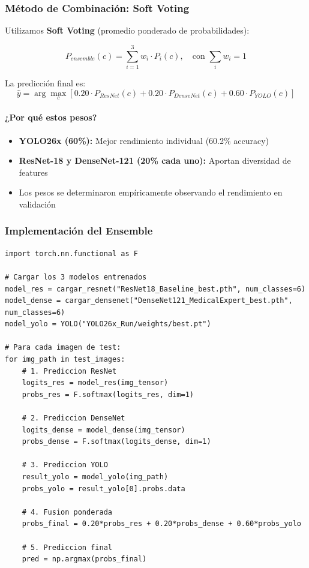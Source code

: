 \documentclass[12pt,a4paper]{article}
\begin{document}
\subsubsection{Método de Combinación: Soft Voting}

Utilizamos \textbf{Soft Voting} (promedio ponderado de probabilidades):

\begin{equation}
P_{ensemble}(c) = \sum_{i=1}^{3} w_i \cdot P_i(c), \quad \text{con } \sum_i w_i = 1
\end{equation}

La predicción final es:
\begin{equation}
\hat{y} = \arg\max_c \left[ 0.20 \cdot P_{ResNet}(c) + 0.20 \cdot P_{DenseNet}(c) + 0.60 \cdot P_{YOLO}(c) \right]
\end{equation}

\paragraph{¿Por qué estos pesos?}
\begin{itemize}
    \item \textbf{YOLO26x (60\%):} Mejor rendimiento individual (60.2\% accuracy)
    \item \textbf{ResNet-18 y DenseNet-121 (20\% cada uno):} Aportan diversidad de features
    \item Los pesos se determinaron empíricamente observando el rendimiento en validación
\end{itemize}

\subsubsection{Implementación del Ensemble}

\begin{lstlisting}[caption={Código del Ensemble (Prueba 2)}]
import torch.nn.functional as F

# Cargar los 3 modelos entrenados
model_res = cargar_resnet("ResNet18_Baseline_best.pth", num_classes=6)
model_dense = cargar_densenet("DenseNet121_MedicalExpert_best.pth", num_classes=6)
model_yolo = YOLO("YOLO26x_Run/weights/best.pt")

# Para cada imagen de test:
for img_path in test_images:
    # 1. Prediccion ResNet
    logits_res = model_res(img_tensor)
    probs_res = F.softmax(logits_res, dim=1)

    # 2. Prediccion DenseNet
    logits_dense = model_dense(img_tensor)
    probs_dense = F.softmax(logits_dense, dim=1)

    # 3. Prediccion YOLO
    result_yolo = model_yolo(img_path)
    probs_yolo = result_yolo[0].probs.data

    # 4. Fusion ponderada
    probs_final = 0.20*probs_res + 0.20*probs_dense + 0.60*probs_yolo

    # 5. Prediccion final
    pred = np.argmax(probs_final)
\end{lstlisting}
\end{document}
